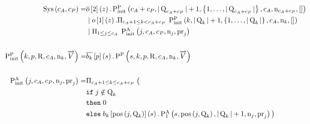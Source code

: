 \begin{align*}
\operatorname{Sys}\left(c_A, c_P\right) =
&
    \overline{o}\left[2\right]\left(z\right).
    \textstyle\operatorname{P^{P}_{init}}\left(
        c_A + c_P,
        |\operatorname{Q}_{c_A + c_P}| + 1,
        \left\{1,\ldots,|\operatorname{Q}_{c_A + c_P}|\right\},
        c_A,
        \operatorname{n}_{c_A + c_P},
        \mathtt{[]}
    \right)\\
&\; | \;
    o\left[1\right]\left(z\right).
    \Pi_{c_A + 1 \leq k < c_A + c_P}\; \textstyle\operatorname{P^{P}_{init}}\left(
        k,
        |\operatorname{Q}_{k}| + 1,
        \left\{1,\ldots,|\operatorname{Q}_{k}|\right\},
        c_A,
        \operatorname{n}_{k},
        \mathtt{[]}
    \right)\\
&\; | \;
    \Pi_{1 \leq j \leq c_A}\;
    \textstyle\operatorname{P^{A}_{init}}\left(
        j,
        c_A,
        c_P,
        \operatorname{n}_{j},
        \operatorname{pr}_{j}
    \right)
\\\\
\textstyle\operatorname{P^{P}_{init}}\left(
    k,
    p,
    \operatorname{R},
    c_A,
    \operatorname{n}_{k},
    \overrightarrow{V}
\right) =
&
    \overline{b_{k}}\left[p\right]\left(s\right) .
    \textstyle\operatorname{P^{P}_{}}\left(
        s,
        k,
        p,
        \operatorname{R},
        c_A,
        \operatorname{n}_{k},
        \overrightarrow{V}
    \right)
\\\\
\textstyle\operatorname{P^{A}_{init}}\left(
    j,
    c_A,
    c_P,
    \operatorname{n}_{j},
    \operatorname{pr}_{j}
\right) =
&
    \Pi_{c_A + 1 \leq k \leq c_A + c_P}\;\big(\\
&
    \mathtt{if}\; j\notin\operatorname{Q}_{k}\\
&
    \mathtt{then}\; 0\\
&
    \mathtt{else}\;
        b_{k}\left[\operatorname{pos}\left(j, \operatorname{Q}_{k}\right)\right]\left(s\right).
        \textstyle\operatorname{P^{A}_{1}}\left(
            s,
            \operatorname{pos}\left(j, \operatorname{Q}_{k}\right),
            |\operatorname{Q}_{k}| + 1,
            \operatorname{n}_{j},
            \operatorname{pr}_{j}
        \right)
\big)
\end{align*}

